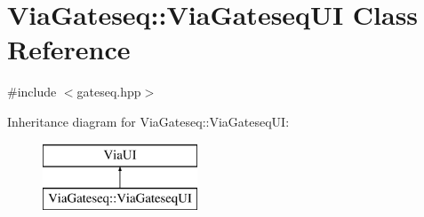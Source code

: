 \hypertarget{class_via_gateseq_1_1_via_gateseq_u_i}{}\section{Via\+Gateseq\+:\+:Via\+Gateseq\+UI Class Reference}
\label{class_via_gateseq_1_1_via_gateseq_u_i}


{\ttfamily \#include $<$gateseq.\+hpp$>$}

Inheritance diagram for Via\+Gateseq\+:\+:Via\+Gateseq\+UI\+:\begin{figure}[H]
\begin{center}
\leavevmode
\includegraphics[height=2.000000cm]{class_via_gateseq_1_1_via_gateseq_u_i}
\end{center}
\end{figure}
